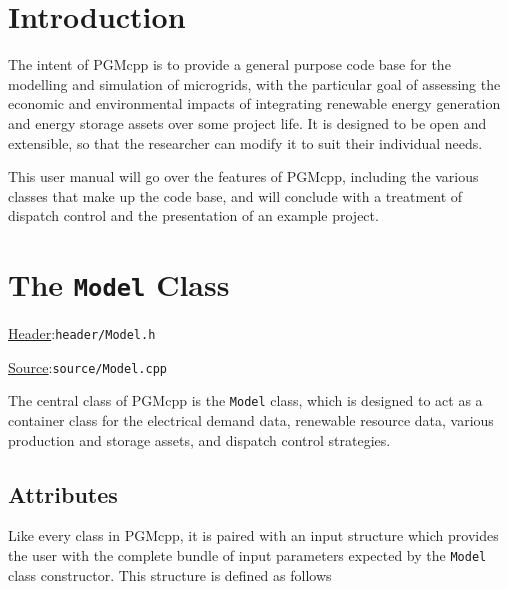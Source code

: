 \documentclass[12pt, letterpaper]{report}
\begin{document}
\tableofcontents
{}

\listoftables
{}


\newpage 
{}
\chapter{Introduction}

The intent of PGMcpp is to provide a general purpose code base for the modelling and simulation of microgrids, with the particular goal of assessing the economic and environmental impacts of integrating renewable energy generation and energy storage assets over some project life. It is designed to be open and extensible, so that the researcher can modify it to suit their individual needs.\par 
This user manual will go over the features of PGMcpp, including the various classes that make up the code base, and will conclude with a treatment of dispatch control and the presentation of an example project.

\chapter{The \texttt{Model} Class}

\begin{large}
\noindent\underline{Header}:\quad\texttt{header/Model.h}\par
\noindent\underline{Source}:\quad\texttt{source/Model.cpp}\par
\end{large}
\vspace{5mm}

The central class of PGMcpp is the \texttt{Model} class, which is designed to act as a container class for the electrical demand data, renewable resource data, various production and storage assets, and dispatch control strategies.

\section{Attributes}

Like every class in PGMcpp, it is paired with an input structure which provides the user with the complete bundle of input parameters expected by the \texttt{Model} class constructor. This structure is defined as follows
\end{document}
